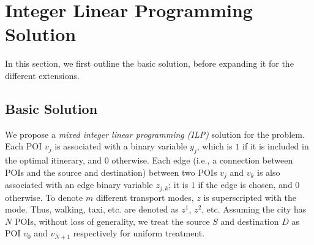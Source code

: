 \section{Integer Linear Programming Solution}
\label{sec:ilp}

In this section, we first outline the basic solution, before expanding it for
the different extensions.

\subsection{Basic Solution}
\label{sec:basic}

We propose a \emph{mixed integer linear programming (ILP)} solution for the
\trip problem.  Each POI $v_{j}$ is associated with a binary variable $y_{j}$,
which is $1$ if it is included in the optimal itinerary, and $0$ otherwise.
Each edge (i.e., a connection between POIs and the source and destination)
between two POIs $v_{j}$ and $v_{k}$ is also associated with an edge binary
variable $z_{j,k}$; it is $1$ if the edge is chosen, and $0$ otherwise.  To
denote $m$ different transport modes, $z$ is superscripted with the mode.  Thus,
walking, taxi, etc. are denoted as $z^1$, $z^2$, etc.  Assuming the city has $N$
POIs, without loss of generality, we treat the source $S$ and destination $D$ as
POI $v_{0}$ and $v_{{N+1}}$ respectively for uniform treatment.

